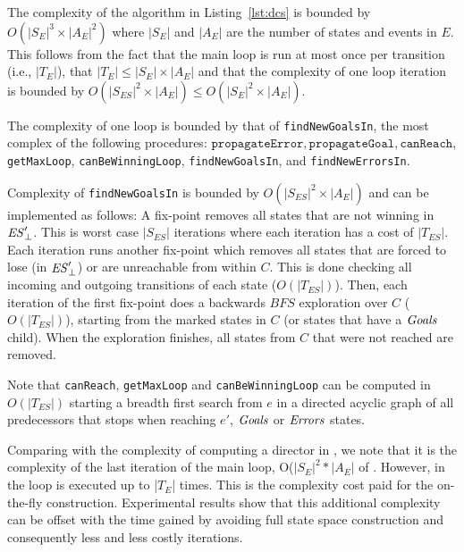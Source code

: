 The complexity of the algorithm in Listing~\ref{lst:dcs} is bounded by  
	$O(|S_E|^3 
	\times |A_E|^2)$ where $|S_E|$ and $|A_E|$ are the number of states and events in 
	$E$. This follows from the fact that the main loop is run at most once per transition (i.e., 
	$|T_{E}|$), that $|T_{E}| \leq|S_{E}|\times|A_E|$ and that the complexity of one 
	loop iteration is bounded by $O(|S_{ES}|^2 \times |A_{E}|) \leq O(|S_{E}|^2 \times 
	|A_{E}|) $.

The complexity of one loop is bounded by that of \texttt{findNewGoalsIn}, the 
	most 
	complex of the following procedures: $\texttt{propagateError}, \texttt{propagateGoal}, 
	\texttt{canReach}$, \texttt{getMaxLoop}, \texttt{canBeWinningLoop}, 
	\texttt{findNewGoalsIn}, and \texttt{findNewErrorsIn}.


Complexity of \texttt{findNewGoalsIn} is bounded by 
	$O(|S_{ES}|^2 \times |A_{E}|)$ and can be implemented as follows: 
	A fix-point removes all states that are not winning
	in $\mathit{\mathit{ES}'_{\bot}}$.
	This is worst case $|S_{ES}|$ iterations where each iteration
	has a cost of $|T_{ES}|$.
	Each iteration runs another fix-point which removes all states
	that are forced to lose (in $\mathit{\mathit{ES}'_{\bot}}$)
	or are unreachable from within $C$.
	This is done checking all incoming and outgoing transitions
	of each state ($O(|T_{ES}|)$). 
	Then, each iteration of the first fix-point does a backwards $BFS$
	exploration over $C$ ($O(|T_{ES}|)$), starting from the marked states in $C$ (or states that
	have a $\mathit{Goals}$ child). When the exploration finishes, all states from 
	$C$ that were not reached are removed.


Note that \texttt{canReach}, \texttt{getMaxLoop} and 
	\texttt{canBeWinningLoop} can be computed in $O(|T_{ES}|)$ starting a breadth 
	first search from 
	$e$ in a directed acyclic graph of all predecessors that stops when 
	reaching $e'$, $\mathit{Goals}$ or $\mathit{Errors}$ states.



Comparing with the complexity of  computing a director in 
	\cite{Huang:2007:Optimal}, we note that it is the complexity of the last iteration of 
	the main loop, O($|S_{E}|^2 * 
	|A_{E}|$ of \DCS. However, in \DCS the loop is executed up to 
	|$T_E$| times. This is the complexity cost paid for the on-the-fly construction. 
	Experimental results show that this additional complexity can be offset with the time 
	gained by avoiding full state space construction and consequently less and less costly 
	iterations. 

